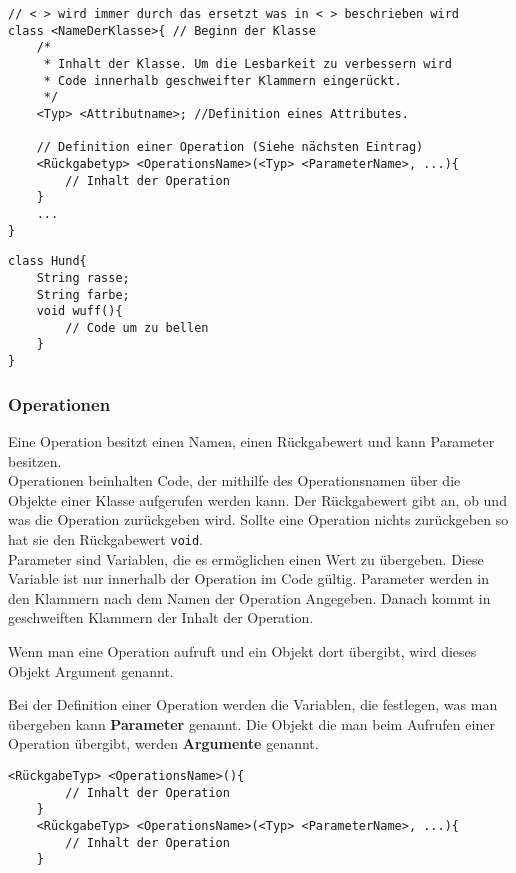 \begin{lstlisting}[title=\textbf{Klassen Syntax}]
// < > wird immer durch das ersetzt was in < > beschrieben wird
class <NameDerKlasse>{ // Beginn der Klasse
	/*  
	 * Inhalt der Klasse. Um die Lesbarkeit zu verbessern wird
	 * Code innerhalb geschweifter Klammern eingerückt.
	 */
	<Typ> <Attributname>; //Definition eines Attributes.
	
	// Definition einer Operation (Siehe nächsten Eintrag)
	<Rückgabetyp> <OperationsName>(<Typ> <ParameterName>, ...){
		// Inhalt der Operation
	}
	...
}
\end{lstlisting}

\newpage

\begin{lstlisting}[title=\textbf{Klassen Beispiel}]
class Hund{
	String rasse;
	String farbe;
	void wuff(){
		// Code um zu bellen
	}
}
\end{lstlisting}

\subsubsection*{Operationen}
Eine Operation besitzt einen Namen, einen Rückgabewert und kann Parameter besitzen.\\
Operationen beinhalten Code, der mithilfe des Operationsnamen über die Objekte einer Klasse aufgerufen werden kann.
Der Rückgabewert gibt an, ob und was die Operation zurückgeben wird.
Sollte eine Operation nichts zurückgeben so hat sie den Rückgabewert \lstinline{void}.\\
Parameter sind Variablen, die es ermöglichen einen Wert zu übergeben. Diese Variable ist nur innerhalb der Operation im Code gültig.
Parameter werden in den Klammern nach dem Namen der Operation Angegeben.
Danach kommt in geschweiften Klammern der Inhalt der Operation.

Wenn man eine Operation aufruft und ein Objekt dort übergibt, wird dieses Objekt Argument genannt.
\vspace{5mm}

\begin{Infobox}
Bei der Definition einer Operation werden die Variablen, die festlegen, was man übergeben kann \textbf{Parameter} genannt. Die Objekt die man beim Aufrufen einer Operation übergibt, werden \textbf{Argumente} genannt. 
\end{Infobox}

\begin{lstlisting}[title=\textbf{Operations Syntax}]
	<RückgabeTyp> <OperationsName>(){
		// Inhalt der Operation
	}
	<RückgabeTyp> <OperationsName>(<Typ> <ParameterName>, ...){
		// Inhalt der Operation
	}
\end{lstlisting}

